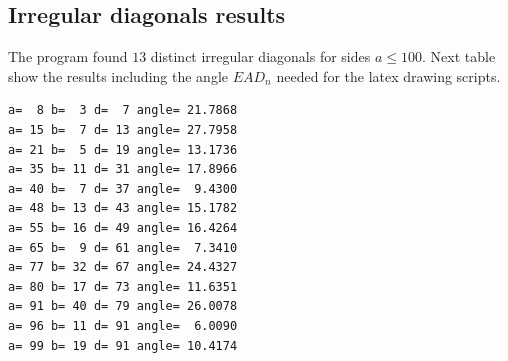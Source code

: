 \documentclass[11pt]{article}
\begin{document}
\subsection{Irregular diagonals results}
The program found $13$ distinct irregular diagonals for sides $a \leq 100$.
Next table show the results including the angle $EAD_n$ needed for the latex drawing scripts.
\begin{lstlisting}
a=  8 b=  3 d=  7 angle= 21.7868
a= 15 b=  7 d= 13 angle= 27.7958
a= 21 b=  5 d= 19 angle= 13.1736
a= 35 b= 11 d= 31 angle= 17.8966
a= 40 b=  7 d= 37 angle=  9.4300
a= 48 b= 13 d= 43 angle= 15.1782
a= 55 b= 16 d= 49 angle= 16.4264
a= 65 b=  9 d= 61 angle=  7.3410
a= 77 b= 32 d= 67 angle= 24.4327
a= 80 b= 17 d= 73 angle= 11.6351
a= 91 b= 40 d= 79 angle= 26.0078
a= 96 b= 11 d= 91 angle=  6.0090
a= 99 b= 19 d= 91 angle= 10.4174
\end{lstlisting}

\newcommand{\strip}[4][000000]{ %
 \definecolor{main}{HTML}{#1}
 \draw[main] (0,{{2*#4}})
   -- ++({#2*#3},0) arc(+90:-90:{2*#4})
   -- ++({-#2*#3},0) arc(270:90:{2*#4});
 \foreach \x in {0,1,...,#2}
  \draw[main] (\x*#3,0) circle (#4);
}
\end{document}
